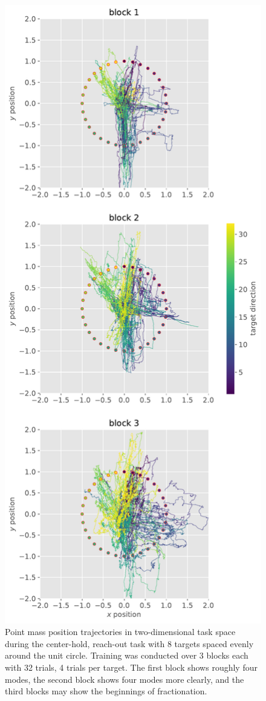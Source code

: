 \documentclass[
  a4paper,
]{article}
\makeatletter
\newcounter{figno}
\newenvironment{fignos:no-prefix-figure-caption}{
  \caption@ifcompatibility{}{
    \let\oldthefigure\thefigure
    \let\oldtheHfigure\theHfigure
    \renewcommand{\thefigure}{figno:\thefigno}
    \renewcommand{\theHfigure}{figno:\thefigno}
    \stepcounter{figno}
    \captionsetup{labelformat=empty}
  }
}{
  \caption@ifcompatibility{}{
    \captionsetup{labelformat=default}
    \let\thefigure\oldthefigure
    \let\theHfigure\oldtheHfigure
    \addtocounter{figure}{-1}
  }
}
\makeatother
\begin{document}
\begin{fignos:no-prefix-figure-caption}

\begin{figure}
\centering
\includegraphics{images/data_analysis/center_hold/trajectories.pdf}
\caption{Point mass position trajectories in two-dimensional task space
during the center-hold, reach-out task with 8 targets spaced evenly
around the unit circle. Training was conducted over 3 blocks each with
32 trials, 4 trials per target. The first block shows roughly four
modes, the second block shows four modes more clearly, and the third
blocks may show the beginnings of fractionation.}
\end{figure}

\end{fignos:no-prefix-figure-caption}
\end{document}
